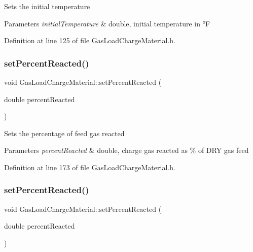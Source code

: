 Sets the initial temperature 
\begin{DoxyParams}{Parameters}
{\em initial\+Temperature} & double, initial temperature in °F \\
\hline
\end{DoxyParams}


Definition at line 125 of file Gas\+Load\+Charge\+Material.\+h.

\mbox{\label{class_gas_load_charge_material_a7142cb6bbfba53d640dd6f1590fe32f6}} 
\subsubsection{\texorpdfstring{set\+Percent\+Reacted()}{setPercentReacted()}\hspace{0.1cm}{\footnotesize\ttfamily [1/3]}}
{\footnotesize\ttfamily void Gas\+Load\+Charge\+Material\+::set\+Percent\+Reacted (\begin{DoxyParamCaption}\item[{double}]{percent\+Reacted }\end{DoxyParamCaption})\hspace{0.3cm}{\ttfamily [inline]}}

Sets the percentage of feed gas reacted 
\begin{DoxyParams}{Parameters}
{\em percent\+Reacted} & double, charge gas reacted as \% of D\+RY gas feed \\
\hline
\end{DoxyParams}


Definition at line 173 of file Gas\+Load\+Charge\+Material.\+h.

\mbox{\label{class_gas_load_charge_material_a7142cb6bbfba53d640dd6f1590fe32f6}} 
\subsubsection{\texorpdfstring{set\+Percent\+Reacted()}{setPercentReacted()}\hspace{0.1cm}{\footnotesize\ttfamily [2/3]}}
{\footnotesize\ttfamily void Gas\+Load\+Charge\+Material\+::set\+Percent\+Reacted (\begin{DoxyParamCaption}\item[{double}]{percent\+Reacted }\end{DoxyParamCaption})\hspace{0.3cm}{\ttfamily [inline]}}

